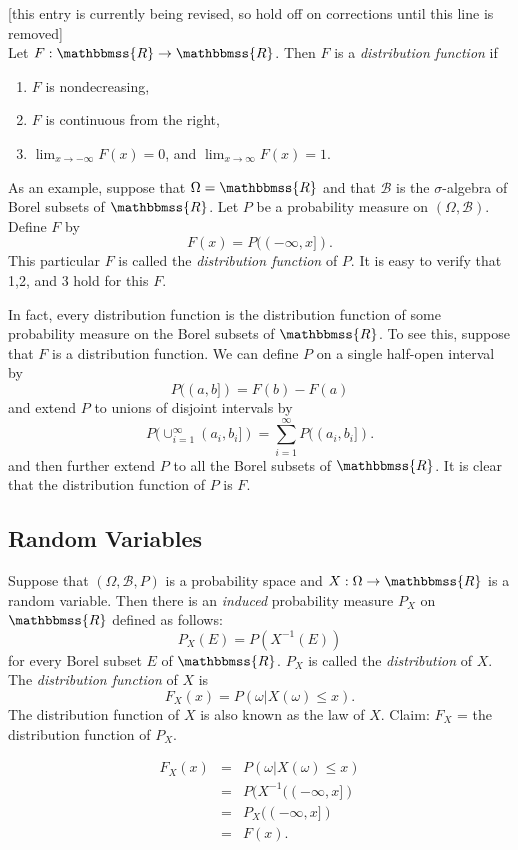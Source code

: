 \documentclass[12pt]{article}
\newcommand{\mathbb}[1]{\mathbbmss{#1}}
\begin{document}
[this entry is currently being revised, so hold off on corrections until
this line is removed]\\

Let $F: \mathbb{R}\to \mathbb{R}$. Then $F$ is a \emph{distribution function} if
\begin{enumerate}
\item
$F$ is nondecreasing,
\item
$F$ is continuous from the right,
\item
$\lim_{x \rightarrow -\infty} F(x) = 0$, and $\lim_{x \rightarrow \infty} F(x) = 1$.
\end{enumerate}

As an example, suppose that $\Omega = \mathbb{R}$ and that $\mathcal{B}$
is the $\sigma$-algebra of Borel subsets of $\mathbb{R}$. 
Let $P$ be a probability measure on $(\Omega, \mathcal{B})$. 
Define $F$ by
$$
F(x) = P((-\infty, x]).
$$
This particular $F$ is called the \emph{distribution function} of $P$. It is
easy to verify that 1,2, and 3 hold for this $F$.

In fact, every distribution function is the distribution function of some
probability measure on the Borel subsets of $\mathbb{R}$. To see this, 
suppose that $F$ is a distribution function. We can define $P$ on a single half-open 
interval by 
$$
P((a,b]) = F(b) - F(a)
$$
and extend  $P$ to unions of disjoint intervals by 
$$
P( \cup_{i=1}^\infty (a_i, b_i])= \sum_{i=1}^\infty P((a_i, b_i]).
$$
and then further extend $P$ to all the Borel subsets of $\mathbb{R}$.
It is clear that the distribution function of $P$ is $F$.

\subsection{Random Variables}

Suppose that $(\Omega, \mathcal{B}, P)$ is a probability space and
$X: \Omega \to \mathbb{R}$ is a random variable. Then there is an
\emph{induced} probability measure $P_X$ on $\mathbb{R}$ defined as 
follows: \\
$$
P_X(E) = P(X^{-1}(E))
$$
for every Borel subset $E$ of $\mathbb{R}$. $P_X$ is called the
\emph{distribution} of $X$. The \emph{distribution function}
of $X$ is 
$$
F_X(x) = P(\omega | X(\omega) \leq x).
$$
The distribution function of $X$ is also known as the law of $X$.
Claim: $F_X$ = the distribution function of $P_X$.


\begin{eqnarray*}
F_X(x) &=& P(\omega | X(\omega) \leq x) \\
&=& P(X^{-1}((-\infty, x]) \\
&=& P_X((-\infty, x]) \\
&=& F(x).
\end{eqnarray*}
\end{document}
